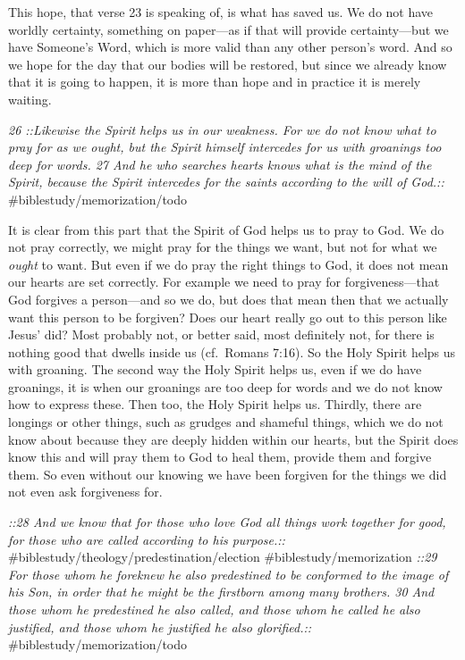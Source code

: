 This hope, that verse 23 is speaking of, is what has saved us. We do not
have worldly certainty, something on paper---as if that will provide
certainty---but we have Someone's Word, which is more valid than any
other person's word. And so we hope for the day that our bodies will be
restored, but since we already know that it is going to happen, it is
more than hope and in practice it is merely waiting.

\emph{26 ::Likewise the Spirit helps us in our weakness. For we do not
know what to pray for as we ought, but the Spirit himself intercedes for
us with groanings too deep for words. 27 And he who searches hearts
knows what is the mind of the Spirit, because the Spirit intercedes for
the saints according to the will of God.::}
\#biblestudy/memorization/todo

It is clear from this part that the Spirit of God helps us to pray to
God. We do not pray correctly, we might pray for the things we want, but
not for what we \emph{ought} to want. But even if we do pray the right
things to God, it does not mean our hearts are set correctly. For
example we need to pray for forgiveness---that God forgives a
person---and so we do, but does that mean then that we actually want
this person to be forgiven? Does our heart really go out to this person
like Jesus' did? Most probably not, or better said, most definitely not,
for there is nothing good that dwells inside us (cf.~Romans 7:16). So
the Holy Spirit helps us with groaning. The second way the Holy Spirit
helps us, even if we do have groanings, it is when our groanings are too
deep for words and we do not know how to express these. Then too, the
Holy Spirit helps us. Thirdly, there are longings or other things, such
as grudges and shameful things, which we do not know about because they
are deeply hidden within our hearts, but the Spirit does know this and
will pray them to God to heal them, provide them and forgive them. So
even without our knowing we have been forgiven for the things we did not
even ask forgiveness for.

\emph{::28 And we know that for those who love God all things work
together for good, for those who are called according to his purpose.::}
\#biblestudy/theology/predestination/election \#biblestudy/memorization
\emph{::29 For those whom he foreknew he also predestined to be
conformed to the image of his Son, in order that he might be the
firstborn among many brothers. 30 And those whom he predestined he also
called, and those whom he called he also justified, and those whom he
justified he also glorified.::} \#biblestudy/memorization/todo

